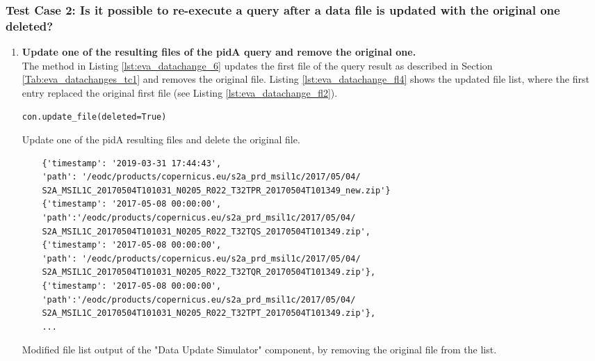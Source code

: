 \documentclass[draft,final]{vutinfth} %
\newenvironment{code}{\captionsetup{type=listing}}{}
\begin{document}
\subsubsection{Test Case 2: Is it possible to re-execute a query after a data file is updated with the original one deleted?}

\begin{enumerate}
	\setcounter{enumi}{+1}
	\item \textbf{Update one of the resulting files of the pidA query and remove the original one.}\\ 
	The method in Listing \ref{lst:eva_datachange_6} updates the first file of the query result as described in Section \ref{Tab:eva_datachanges_tc1} and removes the original file. Listing \ref{lst:eva_datachange_fl4} shows the updated file list, where the first entry replaced the original first file (see Listing \ref{lst:eva_datachange_fl2}).
	\begin{code}
	\begin{verbatim}
con.update_file(deleted=True)
	\end{verbatim}
	\caption{Update one of the pidA resulting files and delete the original file.}
	\label{lst:eva_datachange_6}
	\end{code}

\begin{code}
	\begin{verbatim} 
	{'timestamp': '2019-03-31 17:44:43', 
	'path': '/eodc/products/copernicus.eu/s2a_prd_msil1c/2017/05/04/
	S2A_MSIL1C_20170504T101031_N0205_R022_T32TPR_20170504T101349_new.zip'}
	{'timestamp': '2017-05-08 00:00:00',
	'path':'/eodc/products/copernicus.eu/s2a_prd_msil1c/2017/05/04/
	S2A_MSIL1C_20170504T101031_N0205_R022_T32TQS_20170504T101349.zip', 
	{'timestamp': '2017-05-08 00:00:00', 
	'path': '/eodc/products/copernicus.eu/s2a_prd_msil1c/2017/05/04/
	S2A_MSIL1C_20170504T101031_N0205_R022_T32TQR_20170504T101349.zip'}, 
	{'timestamp': '2017-05-08 00:00:00',
	'path':'/eodc/products/copernicus.eu/s2a_prd_msil1c/2017/05/04/
	S2A_MSIL1C_20170504T101031_N0205_R022_T32TPT_20170504T101349.zip'},
	...
	\end{verbatim}
	\caption{Modified file list output of the "Data Update Simulator" component, by removing the original file from the list.}
	\label{lst:eva_datachange_fl4}
\end{code}	
	

\end{enumerate}
\end{document}
